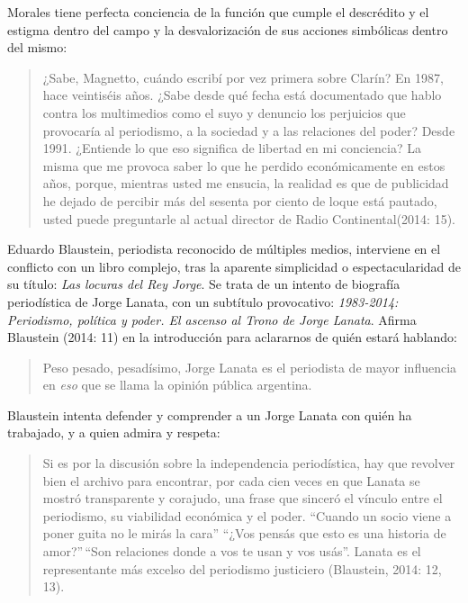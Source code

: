 {Morales tiene perfecta conciencia de la función que cumple el descrédito y el estigma dentro del campo y la desvalorización de sus acciones simbólicas dentro del mismo:

\begin{quote}
¿Sabe, Magnetto, cuándo escribí por vez primera sobre Clarín? En 1987, hace veintiséis años. ¿Sabe desde qué fecha está documentado que hablo contra los multimedios como el suyo y denuncio los perjuicios que provocaría al periodismo, a la sociedad y a las relaciones del poder? Desde 1991. ¿Entiende lo que eso significa de libertad en mi conciencia? La misma que me provoca saber lo que he perdido económicamente en estos años, porque, mientras usted me ensucia, la realidad es que de publicidad he dejado de percibir más del sesenta por ciento de loque está pautado, usted puede preguntarle al actual director de Radio Continental(2014: 15).
\end{quote}

Eduardo Blaustein, periodista reconocido de múltiples medios, interviene en el conflicto con un libro complejo, tras la aparente simplicidad o espectacularidad de su título: \emph{Las locuras del Rey Jorge}. Se trata de un intento de biografía periodística de Jorge Lanata, con un subtítulo provocativo: \emph{1983-2014: Periodismo, política y poder. El ascenso al Trono de Jorge Lanata}. Afirma Blaustein (2014: 11) en la introducción para aclararnos de quién estará hablando:

\begin{quote}
Peso pesado, pesadísimo, Jorge Lanata es el periodista de mayor influencia en \emph{eso} que se llama la opinión pública argentina.
\end{quote}

Blaustein intenta defender y comprender a un Jorge Lanata con quién ha trabajado, y a quien admira y respeta:

\begin{quote}
Si es por la discusión sobre la independencia periodística, hay que revolver bien el archivo para encontrar, por cada cien veces en que Lanata se mostró transparente y corajudo, una frase que sinceró el vínculo entre el periodismo, su viabilidad económica y el poder. ``Cuando un socio viene a poner guita no le mirás la cara'' ``¿Vos pensás que esto es una historia de amor?''\,``Son relaciones donde a vos te usan y vos usás''. Lanata es el representante más excelso del periodismo justiciero (Blaustein, 2014: 12, 13).
\end{quote}

}
